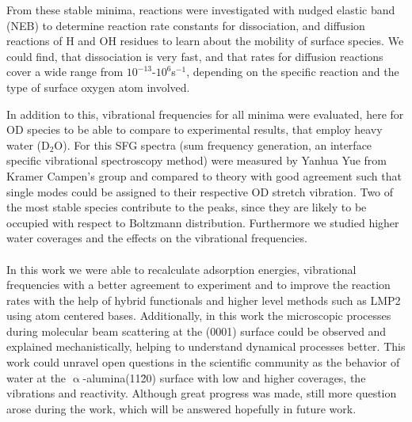 \documentclass[11pt,DIV=13,a4paper,headinclude]{scrartcl}
\begin{document}
From these stable minima, reactions were investigated with nudged elastic band (NEB) to determine reaction rate constants for dissociation, and diffusion reactions of H and OH residues to learn about the mobility of surface species.
We could find, that dissociation is very fast, and that rates for diffusion reactions cover a wide range from $10^{-13}$-$10^6$s$^{-1}$, depending on the specific reaction and the type of surface oxygen atom involved. 


In addition to this, vibrational frequencies for all minima were evaluated, here for OD species to be able to compare to experimental results, that employ heavy water (D$_2$O).
For this SFG spectra (sum frequency generation, an interface specific vibrational spectroscopy method) were measured by Yanhua Yue from Kramer Campen's group and compared to theory with good agreement such that single modes could be assigned to their respective OD stretch vibration.
Two of the most stable species contribute to the peaks, since they are likely to be occupied with respect to Boltzmann distribution.
Furthermore we studied higher water coverages and the effects on the vibrational frequencies.
% 
% 
\\
\\
In this work we were able to recalculate adsorption energies, vibrational frequencies with a better agreement to experiment and to improve the reaction rates with the help of hybrid functionals and higher level methods such as LMP2 using atom centered bases.
Additionally, in this work the microscopic processes during molecular beam scattering at the (0001) surface could be observed and explained mechanistically, helping to understand dynamical processes better.
This work could unravel open questions in the scientific community as the behavior of water at the $\upalpha$-alumina(11\=20) surface with low and higher coverages, the vibrations and reactivity.
Although great progress was made, still more question arose during the work, which will be answered hopefully in future work.
\end{document}
